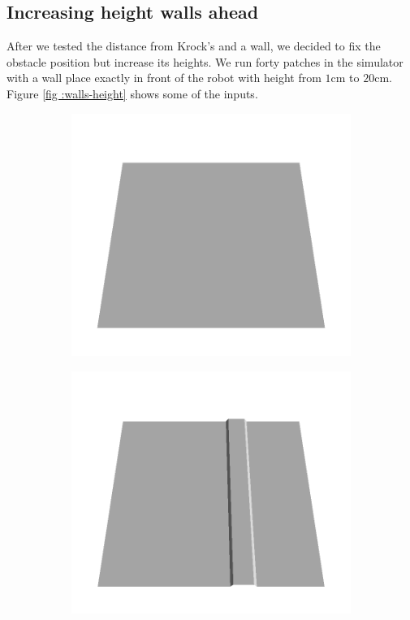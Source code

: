 \documentclass[../document.tex]{subfiles}
\begin{document}
\subsection{Increasing height walls ahead}
After we tested the distance from Krock's and a wall, we decided to fix the obstacle position but increase its heights.  We run forty patches in the simulator with a wall place exactly in front of the robot with height from $1$cm to $20$cm. Figure \ref{fig :walls-height} shows some of the inputs.

\begin{figure}[htbp]
    \centering
    \begin{subfigure}[b]{0.24\textwidth}
    \includegraphics[width=\linewidth]{../img/5/custom_patches/walls_increasing/all/00-3d.png}
    \end{subfigure}
    \begin{subfigure}[b]{0.24\textwidth}
    \includegraphics[width=\linewidth]{../img/5/custom_patches/walls_increasing/all/03-3d.png}

\end{subfigure}
\end{figure}
\end{document}
